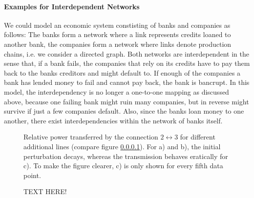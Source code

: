 \documentclass{scrartcl}
\begin{document}
\paragraph{Examples for Interdependent Networks}
We could model an economic system constisting of banks and companies as
follows: The banks form a network where a link represents credits loaned to
another bank, the companies form a network where links denote production
chains, i.e. we consider a directed graph.  Both networks are
interdependent in the sense that, if a bank fails, the companies that rely
on its credits have to pay them back to the banks creditors and might
default to.  If enough of the companies a bank has lended money to fail and
cannot pay back, the bank is bancrupt.  In this model, the interdependency
is no longer a one-to-one mapping as discussed above, because one failing
bank might ruin many companies, but in reverse might survive if just a few
companies default.  Also, since the banks loan money to one another, there
exist interdependencies within the network of banks itself.


\begin{figure}[h]
    \centering
    \caption{Relative power transferred by the connection
        $ 2 \leftrightarrow 3$ for different additional lines (compare
        figure \ref{}). For a) and b), the initial perturbation decays,
        whereas the transmission behaves eratically for c). To make the figure
        clearer, c) is only shown for every fifth data point. }
    \label{fig:B31}
\end{figure}

\begin{figure}
    \centering
    \def\svgwidth{0.32\textwidth}
    
    \caption{TEXT HERE!}
    \label{fig:B13}
\end{figure}
\end{document}
